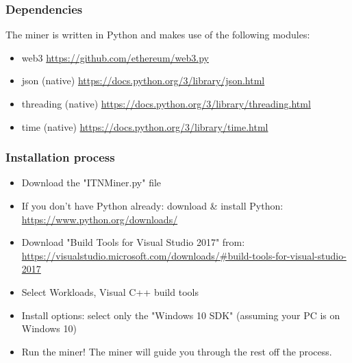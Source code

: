 \documentclass{article}
\begin{document}
\subsubsection{Dependencies}
The miner is written in Python and makes use of the following modules:
\begin{itemize}
    \item web3 \url{https://github.com/ethereum/web3.py}
    \item json (native) \url{https://docs.python.org/3/library/json.html}
    \item threading (native) \url{https://docs.python.org/3/library/threading.html}
    \item time (native) \url{https://docs.python.org/3/library/time.html}
\end{itemize}

\subsubsection{Installation process}

\begin{itemize}
 \item   Download the "ITNMiner.py" file

 \item   If you don't have Python already: download & install Python:  \url {https://www.python.org/downloads/}

 \item   Download "Build Tools for Visual Studio 2017" from: \url{https://visualstudio.microsoft.com/downloads/#build-tools-for-visual-studio-2017} 
    
    \item Select Workloads, Visual C++ build tools
    
    \item Install options: select only the "Windows 10 SDK" (assuming your PC is on Windows 10)
    
   \item  Run the miner! The miner will guide you through the rest off the process.
\end{itemize}
\end{document}
